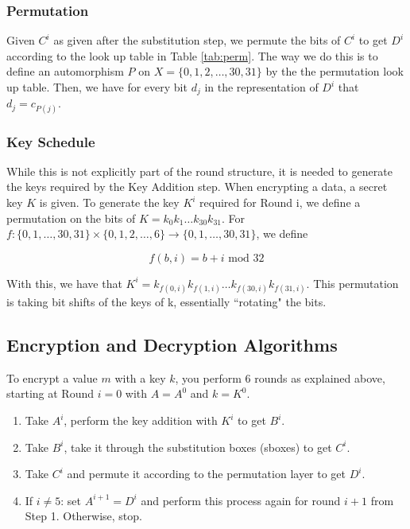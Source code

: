 \documentclass[12pt,a4paper]{article}
\begin{document}
\subsubsection{Permutation}
Given $C^i$ as given after the substitution step, we permute the bits of $C^i$
to get $D^i$ according to the look up table in Table \ref{tab:perm}. The way we
do this is to define an automorphism $P$ on $X = \{0,1,2,\ldots,30,31\}$ by the
the permutation look up table. Then, we have for every bit $d_j$ in the representation
of $D^i$ that $d_j = c_{P(j)}$. 

\subsubsection{Key Schedule}
\label{sec:key_schedule} 

While this is not explicitly part of the round structure, it is needed to
generate the keys required by the Key Addition step. When encrypting a data, a
secret key $K$ is given. To generate the key $K^i$ required for Round i, we
define a permutation on the bits of $K = k_0k_1\ldots k_{30} k_{31}$. For
$f:\{0,1,\ldots,30,31\}\times\{0,1,2,\ldots,6\} \rightarrow
\{0,1,\ldots,30,31\}$, we define

\[f(b,i) = b + i \mbox{ mod } 32 \]

With this, we have that $K^i = k_{f(0,i)} k_{f(1,i)} \ldots k_{f(30,i)}
k_{f(31,i)}$. This permutation is taking bit shifts of the keys of k,
essentially ``rotating" the bits. 

\subsection{Encryption and Decryption Algorithms}

To encrypt a value $m$ with a key $k$, you perform 6 rounds as explained above,
starting at Round $i=0$ with $A = A^0$ and $k=K^0$.

\begin{enumerate}
    \item Take $A^i$, perform the key addition with $K^i$ to get $B^i$.
    \item Take $B^i$, take it through the substitution boxes (sboxes) to get
    $C^i$.
    \item Take $C^i$ and permute it according to the permutation layer to get
    $D^i$.
    \item If $i \neq 5$: set $A^{i+1} = D^i$ and perform this process again for
    round $i+1$ from Step 1. Otherwise, stop. 
\end{enumerate}
\end{document}
